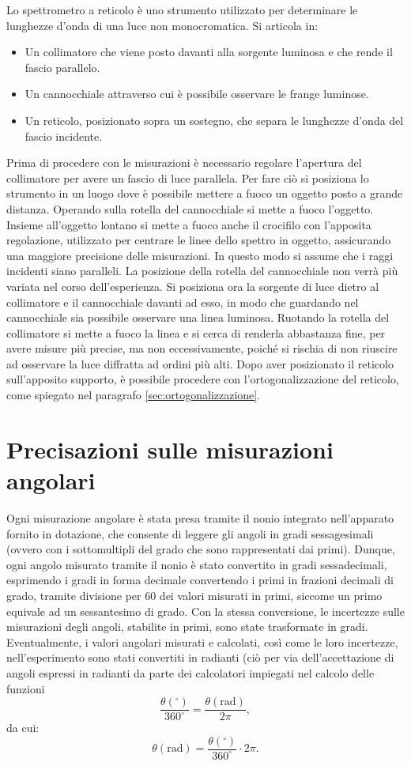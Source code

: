 \documentclass[a4paper,12pt]{article}
\begin{document}
Lo spettrometro a reticolo è uno strumento utilizzato per determinare le lunghezze d’onda di una luce non monocromatica. Si articola in: 
\begin{itemize}
    \item Un collimatore che viene posto davanti alla sorgente luminosa e che rende il fascio parallelo. 
    \item  Un cannocchiale attraverso cui è possibile osservare le frange luminose. 
    \item  Un reticolo, posizionato sopra un sostegno, che separa le lunghezze d’onda del fascio incidente. 
\end{itemize}
Prima di procedere con le misurazioni è necessario regolare l’apertura del collimatore per avere un fascio di luce parallela. Per fare ciò si posiziona lo strumento in un luogo dove è possibile mettere a fuoco un oggetto posto a grande distanza. Operando sulla rotella del cannocchiale si mette a fuoco l’oggetto. Insieme all'oggetto lontano si mette a fuoco anche il crocifilo con l'apposita regolazione, utilizzato per centrare le linee dello spettro in oggetto, assicurando una maggiore precisione delle misurazioni. In questo modo si assume che i raggi incidenti siano paralleli. La posizione della rotella del cannocchiale non verrà più variata nel corso dell’esperienza.  
Si posiziona ora la sorgente di luce dietro al collimatore e il cannocchiale davanti ad esso, in modo che guardando nel cannocchiale sia possibile osservare una linea luminosa. Ruotando la rotella del collimatore si mette a fuoco la linea e si cerca di renderla abbastanza fine, per avere misure più precise, ma non eccessivamente, poiché si rischia di non riuscire ad osservare la luce diffratta ad ordini più alti.  
Dopo aver posizionato il reticolo sull’apposito supporto, è possibile procedere con l’ortogonalizzazione del reticolo, come spiegato nel paragrafo \ref{sec:ortogonalizzazione}.
\section{Precisazioni sulle misurazioni angolari}
Ogni misurazione angolare è stata presa tramite il nonio integrato nell’apparato fornito in dotazione, che consente di leggere gli angoli in gradi sessagesimali (ovvero con i sottomultipli del grado che sono rappresentati dai primi). Dunque, ogni angolo misurato tramite il nonio è stato convertito in gradi sessadecimali, esprimendo i gradi in forma decimale convertendo i primi in frazioni decimali di grado, tramite divisione per 60 dei valori misurati in primi, siccome un primo equivale ad un sessantesimo di grado. Con la stessa conversione, le incertezze sulle misurazioni degli angoli, stabilite in primi, sono state trasformate in gradi. Eventualmente, i valori angolari misurati e calcolati, così come le loro incertezze, nell’esperimento sono stati convertiti in radianti (ciò per via dell’accettazione di angoli espressi in radianti da parte dei calcolatori impiegati nel calcolo delle funzioni
\[
\frac{\theta (^\circ)}{360^\circ} = \frac{\theta (\text{rad})}{2\pi},
\]
da cui:
\[
\theta (\text{rad}) = \frac{\theta (^\circ)}{360^\circ} \cdot 2\pi.
\]
\end{document}
